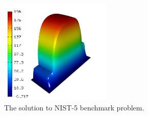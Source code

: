 \documentclass[12pt]{elsarticle}
\begin{document}
\begin{figure}[H]
\centering
\vspace{-3mm}
\includegraphics[height=5cm]{nist/nist-5/solution.png}
\vspace{-3mm}
\caption{The solution to NIST-5 benchmark problem.}
\label{fig:sln-nist05}
\end{figure}

\end{document}
